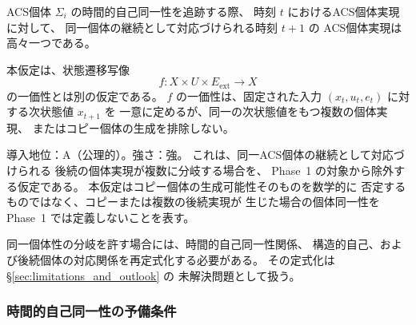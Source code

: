 \begin{assumption}[個体同一性関係の非分岐性]
\label{ass:no_branching}
ACS個体 $\Sigma_i$ の時間的自己同一性を追跡する際、
時刻 $t$ におけるACS個体実現に対して、
同一個体の継続として対応づけられる時刻 $t+1$ の
ACS個体実現は高々一つである。

本仮定は、状態遷移写像
\[
  f:X\times U\times E_{\mathrm{ext}}\to X
\]
の一価性とは別の仮定である。
$f$ の一価性は、固定された入力
$(x_t,u_t,e_t)$ に対する次状態値 $x_{t+1}$ を
一意に定めるが、同一の次状態値をもつ複数の個体実現、
またはコピー個体の生成を排除しない。

\medskip
\noindent
導入地位：A（公理的）。強さ：強。
これは、同一ACS個体の継続として対応づけられる
後続の個体実現が複数に分岐する場合を、
Phase~1 の対象から除外する仮定である。
本仮定はコピー個体の生成可能性そのものを数学的に
否定するものではなく、コピーまたは複数の後続実現が
生じた場合の個体同一性を Phase~1 では定義しないことを表す。

同一個体性の分岐を許す場合には、時間的自己同一性関係、
構造的自己、および後続個体の対応関係を再定式化する必要がある。
その定式化は
\S\ref{sec:limitations_and_outlook} の
未解決問題として扱う。
\end{assumption}

\subsubsection{時間的自己同一性の予備条件}

